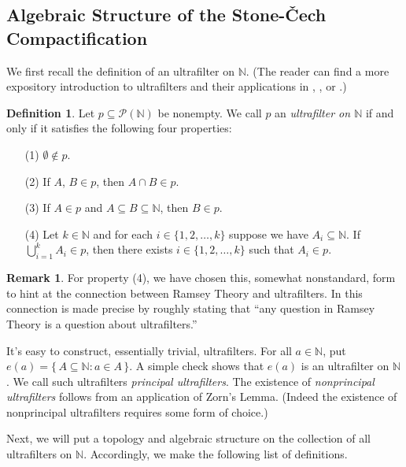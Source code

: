 \documentclass[12pt]{article}
\theoremstyle{plain}
\theoremstyle{definition}
\newtheorem{defn}[thm]{Definition}
\newtheorem{rmk}[thm]{Remark}
\newcommand{\bbN}{\mathbb{N}}
\begin{document}
\subsection{Algebraic Structure of the Stone-\v{C}ech Compactification}
We first recall the definition of an ultrafilter on $\bbN$.
(The reader can find a more expository introduction to ultrafilters
and their applications in \cite{Komjath:2008fk}, \cite{Gowers:zr}, or
\cite{Tao:2007uq}.)
  \begin{defn}
    \label{defn:uf}
    Let $p \subseteq \mathcal{P}(\bbN)$ be nonempty.
    We call $p$ an \textsl{ultrafilter on $\bbN$} if and only if it
    satisfies the following four properties:
      \begin{itemize}
        \item[(1)] $\emptyset \not\in p$.
        \item[(2)] If $A$, $B \in p$, then $A \cap B \in p$.
        \item[(3)] If $A \in p$ and $A \subseteq B \subseteq \bbN$,
          then $B \in p$.
        \item[(4)] Let $k \in \bbN$ and for each $i \in \{1, 2,
          \ldots, k\}$ suppose we have $A_i \subseteq \bbN$. 
          If $\bigcup_{i=1}^k A_i \in p$, then there exists $i \in
          \{1, 2, \ldots, k\}$ such that $A_i \in p$.
      \end{itemize}
  \end{defn}
  \begin{rmk}
    For property (4), we have chosen this, somewhat nonstandard, form
    to hint at the connection between Ramsey Theory and ultrafilters.
    In \cite[Theorem 5.7]{Hindman:1998fk} this connection is made
    precise by roughly stating that ``any question in Ramsey Theory is
    a question about ultrafilters.''
  \end{rmk}

It's easy to construct, essentially trivial, ultrafilters. 
For all $a \in \bbN$, put $e(a) = \{\, A \subseteq \bbN : a \in A
\,\}$.
A simple check shows that $e(a)$ is an ultrafilter on
$\bbN$. 
We call such ultrafilters \textsl{principal ultrafilters}. 
The existence of \textsl{nonprincipal ultrafilters} follows from an
application of Zorn's Lemma. 
(Indeed the existence of nonprincipal ultrafilters requires some form
of choice.)

Next, we will put a topology and algebraic structure on the collection
of all ultrafilters on $\bbN$. 
Accordingly, we make the following list of definitions.
\end{document}

